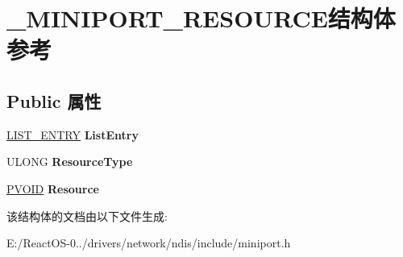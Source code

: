 \hypertarget{struct___m_i_n_i_p_o_r_t___r_e_s_o_u_r_c_e}{}\section{\+\_\+\+M\+I\+N\+I\+P\+O\+R\+T\+\_\+\+R\+E\+S\+O\+U\+R\+C\+E结构体 参考}
\label{struct___m_i_n_i_p_o_r_t___r_e_s_o_u_r_c_e}
\subsection*{Public 属性}
\begin{DoxyCompactItemize}
\item 
\mbox{\label{struct___m_i_n_i_p_o_r_t___r_e_s_o_u_r_c_e_a502ba3a6c73c684ca7d95ff7dc1091b8}} 
\hyperlink{struct___l_i_s_t___e_n_t_r_y}{L\+I\+S\+T\+\_\+\+E\+N\+T\+RY} {\bfseries List\+Entry}
\item 
\mbox{\label{struct___m_i_n_i_p_o_r_t___r_e_s_o_u_r_c_e_aaafe659433bab06a1687452bed65b4f5}} 
U\+L\+O\+NG {\bfseries Resource\+Type}
\item 
\mbox{\label{struct___m_i_n_i_p_o_r_t___r_e_s_o_u_r_c_e_a249dc30410ed189035c59bb1dfa3273c}} 
\hyperlink{interfacevoid}{P\+V\+O\+ID} {\bfseries Resource}
\end{DoxyCompactItemize}


该结构体的文档由以下文件生成\+:\begin{DoxyCompactItemize}
\item 
E\+:/\+React\+O\+S-\/0../drivers/network/ndis/include/miniport.\+h\end{DoxyCompactItemize}
